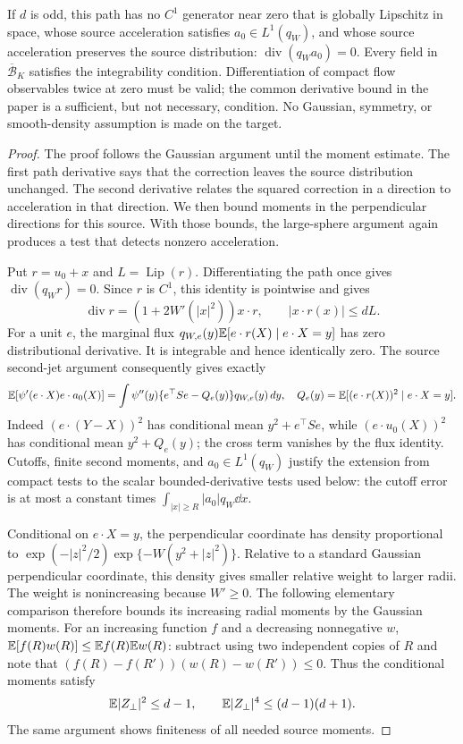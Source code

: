 \begin{theorem}
\label{thm:radial-proof}
If $d$ is odd, this path has no $C^1$ generator near zero that is globally
Lipschitz in space, whose source acceleration satisfies $a_0\in L^1(q_W)$,
and whose source acceleration preserves the source distribution:
$\operatorname{div}(q_Wa_0)=0$. Every field in $\overline{\mathcal B}_K$
satisfies the integrability condition. Differentiation of compact flow observables
twice at zero must be valid; the common derivative bound in the paper is a sufficient,
but not necessary, condition. No Gaussian, symmetry, or smooth-density
assumption is made on the target.
\end{theorem}
\begin{proof}
The proof follows the Gaussian argument until the moment estimate.
The first path derivative says that the correction leaves the source
distribution unchanged. The second derivative relates the squared
correction in a direction to acceleration in that direction.
We then bound moments in the perpendicular directions for this source.
With those bounds, the large-sphere argument again produces a test that
detects nonzero acceleration.

Put $r=u_0+x$ and $L=\operatorname{Lip}(r)$. Differentiating the path once
gives $\operatorname{div}(q_Wr)=0$. Since $r$ is $C^1$, this identity is
pointwise and gives
\[
 \operatorname{div}r=(1+2W'(|x|^2))x\cdot r,
 \qquad |x\cdot r(x)|\le dL.
\]
For a unit $e$, the marginal flux
$q_{W,e}(y)\mathbb E[e\cdot r(X)\mid e\cdot X=y]$ has zero distributional
derivative. It is integrable and hence identically zero. The source
second-jet argument consequently gives exactly
\begin{equation}
 \mathbb E[\psi'(e\cdot X)e\cdot a_0(X)]
 =\int\psi''(y)\{e^\top Se-Q_e(y)\}q_{W,e}(y)\,dy,
 \quad Q_e(y)=\mathbb E[(e\cdot r(X))^2\mid e\cdot X=y].
 \label{eq:radial-twojet}
\end{equation}
Indeed $(e\cdot(Y-X))^2$ has conditional mean $y^2+e^\top Se$, while
$(e\cdot u_0(X))^2$ has conditional mean $y^2+Q_e(y)$; the cross term
vanishes by the flux identity. Cutoffs, finite second moments, and
$a_0\in L^1(q_W)$ justify the extension from compact tests to the scalar
bounded-derivative tests used below: the cutoff error is at most a constant
times $\int_{|x|\ge R}|a_0|q_W\dd x$.

Conditional on $e\cdot X=y$, the perpendicular coordinate has density
proportional to
$\exp(-|z|^2/2)\exp\{-W(y^2+|z|^2)\}$.
Relative to a standard Gaussian perpendicular coordinate, this density
gives smaller relative weight to larger radii. The weight is nonincreasing
because $W'\ge0$. The following elementary comparison therefore bounds
its increasing radial moments by the Gaussian moments. For an increasing function $f$ and a
decreasing nonnegative $w$, $\mathbb E[f(R)w(R)]\le\mathbb E f(R)\mathbb E w(R)$: subtract
using two independent copies of $R$ and note that
$(f(R)-f(R'))(w(R)-w(R'))\le0$.
Thus the conditional moments satisfy
\[
 \mathbb E|Z_\perp|^2\le d-1,\qquad
 \mathbb E|Z_\perp|^4\le(d-1)(d+1).
\]
The same argument shows finiteness of all needed source moments.


\end{proof}
